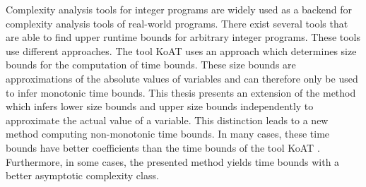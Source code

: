 Complexity analysis tools for integer programs are widely used as a backend for complexity analysis tools of real-world programs.
There exist several tools that are able to find upper runtime bounds for arbitrary integer programs.
These tools use different approaches.
The tool KoAT \cite{koat} uses an approach which determines size bounds for the computation of time bounds.
These size bounds are approximations of the absolute values of variables and can therefore only be used to infer monotonic time bounds.
This thesis presents an extension of the method which infers lower size bounds and upper size bounds independently to approximate the actual value of a variable.
This distinction leads to a new method computing non-monotonic time bounds.
In many cases, these time bounds have better coefficients than the time bounds of the tool KoAT \cite{koat}.
Furthermore, in some cases, the presented method yields time bounds with a better asymptotic complexity class. 
